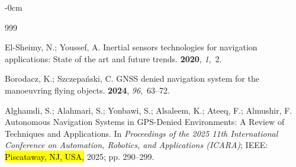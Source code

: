 \documentclass[sensors,article,accept,pdftex,moreauthors]{Definitions/mdpi}
\begin{document}

\begin{adjustwidth}{-\extralength}{0cm}



\begin{thebibliography}{999}

El-Sheimy, N.; Youssef, A.
\newblock Inertial sensors technologies for navigation applications: State of the art and future trends.
 {\bf 2020}, {\em 1},~2.

Borodacz, K.; Szczepa{\'n}ski, C.
\newblock GNSS denied navigation system for the manoeuvring flying objects.
 {\bf 2024}, {\em 96},~63--72.

Alghamdi, S.; Alahmari, S.; Yonbawi, S.; Alsaleem, K.; Ateeq, F.; Almushir, F.
\newblock Autonomous Navigation Systems in GPS-Denied Environments: A Review of Techniques and Applications.
\newblock In \emph{Proceedings of the 2025 11th International Conference on Automation, Robotics, and Applications (ICARA)}; IEEE: \hl{Piscataway, NJ, USA,} %
  2025; pp. 290--299.


\end{thebibliography}
\end{adjustwidth}
\end{document}
